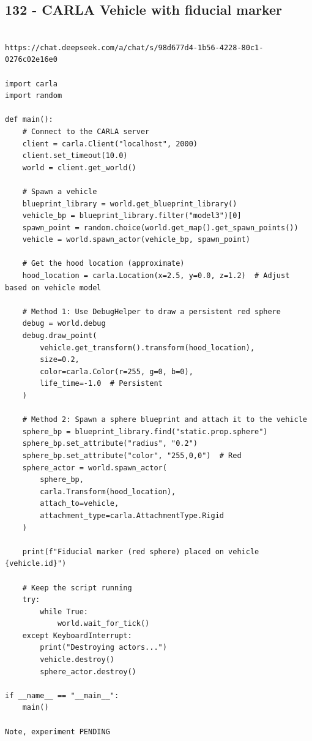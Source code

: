 \subsection{132 - CARLA Vehicle with fiducial marker}
\label{app_res:132}
\begin{verbatim}

https://chat.deepseek.com/a/chat/s/98d677d4-1b56-4228-80c1-0276c02e16e0

import carla
import random

def main():
    # Connect to the CARLA server
    client = carla.Client("localhost", 2000)
    client.set_timeout(10.0)
    world = client.get_world()

    # Spawn a vehicle
    blueprint_library = world.get_blueprint_library()
    vehicle_bp = blueprint_library.filter("model3")[0]
    spawn_point = random.choice(world.get_map().get_spawn_points())
    vehicle = world.spawn_actor(vehicle_bp, spawn_point)

    # Get the hood location (approximate)
    hood_location = carla.Location(x=2.5, y=0.0, z=1.2)  # Adjust based on vehicle model

    # Method 1: Use DebugHelper to draw a persistent red sphere
    debug = world.debug
    debug.draw_point(
        vehicle.get_transform().transform(hood_location),
        size=0.2,
        color=carla.Color(r=255, g=0, b=0),
        life_time=-1.0  # Persistent
    )

    # Method 2: Spawn a sphere blueprint and attach it to the vehicle
    sphere_bp = blueprint_library.find("static.prop.sphere")
    sphere_bp.set_attribute("radius", "0.2")
    sphere_bp.set_attribute("color", "255,0,0")  # Red
    sphere_actor = world.spawn_actor(
        sphere_bp,
        carla.Transform(hood_location),
        attach_to=vehicle,
        attachment_type=carla.AttachmentType.Rigid
    )

    print(f"Fiducial marker (red sphere) placed on vehicle {vehicle.id}")

    # Keep the script running
    try:
        while True:
            world.wait_for_tick()
    except KeyboardInterrupt:
        print("Destroying actors...")
        vehicle.destroy()
        sphere_actor.destroy()

if __name__ == "__main__":
    main()  

Note, experiment PENDING

\end{verbatim}

